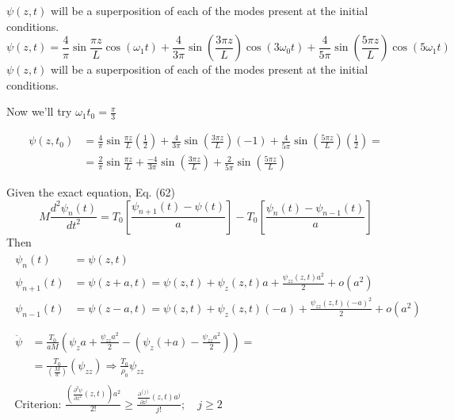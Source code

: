 \documentclass[twoside,10pt]{amsart}
\newcommand{\problemhead}[1]
  {\smallskip
   \noindent{\large\bf Problem #1.}
   \smallskip}
\begin{document}
$\psi(z,t)$ will be a superposition of each of the modes present at the initial conditions.  
\[
\psi(z,t) = \frac{4}{\pi} \sin{ \frac{\pi z}{L} } \cos{ (\omega_1 t) } + \frac{ 4}{3\pi} \sin{ \left( \frac{3\pi z}{ L} \right) } \cos{ (3 \omega_0 t ) } + \frac{4}{ 5 \pi } \sin{ \left( \frac{ 5 \pi z}{L} \right) }\cos{ (5 \omega_1 t ) } 
\]
$\psi(z,t)$ will be a superposition of each of the modes present at the initial conditions.  

Now we'll try $\omega_1 t_0 = \frac{\pi}{3}$

\[
\begin{aligned}
  \psi(z,t_0) & = \frac{4}{\pi} \sin{ \frac{\pi z}{L} } \left( \frac{1}{2} \right) + \frac{4}{3\pi} \sin{ \left( \frac{3\pi z}{ L} \right) } (-1) + \frac{4}{5 \pi} \sin{ \left( \frac{ 5 \pi z}{ L} \right) } \left( \frac{1}{2} \right)  = \\
  & = \frac{2}{\pi} \sin{ \frac{ \pi z}{L} } + \frac{-4}{3 \pi } \sin{ \left( \frac{ 3 \pi z}{ L } \right) } + \frac{2}{ 5 \pi } \sin{ \left( \frac{5 \pi z }{ L} \right) }
\end{aligned}
\]

\problemhead{2.18} Given the exact equation, Eq. (62)
\[
M \frac{ d^2 \psi_n(t)}{ dt^2} = T_0 \left[ \frac{ \psi_{n+1}(t) - \psi(t) }{ a} \right] - T_0 \left[ \frac{ \psi_n(t) - \psi_{n-1}(t) }{ a } \right]
\]
Then
\[
\begin{gathered}
  \begin{aligned}
    \psi_n(t) & = \psi(z,t) \\
    \psi_{n+1}(t) & = \psi(z+a,t) = \psi(z,t) + \psi_z(z,t) a + \frac{ \psi_{zz}(z,t) a^2 }{ 2 } + o(a^2) \\
    \psi_{n-1}(t) & = \psi(z-a,t) = \psi(z,t) + \psi_z(z,t) (-a) + \frac{ \psi_{zz}(z,t) (-a)^2 }{ 2 } + o(a^2) \\
\end{aligned} \\
  \begin{aligned}
    \ddot{\psi} & = \frac{T_0}{aM } (\psi_z a + \frac{ \psi_{zz} a^2}{ 2 } - ( \psi_z(+a) - \frac{ \psi_{zz} a^2}{2} ) ) = \\
    & = \frac{T_0}{ \left( \frac{M}{a} \right) } ( \psi_{zz} ) \Longrightarrow \frac{T_0}{\rho_0} \psi_{zz} 
\end{aligned} \\
  \text{ Criterion: } \frac{ \left( \frac{ \partial^2 \psi }{ \partial z^2 } (z,t) \right) a^2 }{ 2!} \geq \frac{ \frac{ \partial^{(j)} }{ \partial z^j }(z,t) a^j }{ j! } ;\quad j \geq 2 
\end{gathered}
\]
\end{document}
